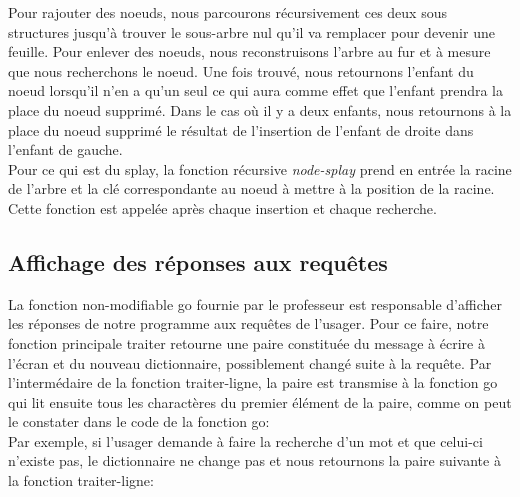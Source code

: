 \documentclass[french]{article}
\begin{document}
		Pour rajouter des noeuds, nous parcourons 
		récursivement ces deux sous structures jusqu'à trouver le sous-arbre 
		nul qu'il va
		remplacer pour devenir une feuille. Pour enlever des noeuds, nous 
		reconstruisons l'arbre au fur et à mesure que nous 
		recherchons le noeud. Une fois trouvé, nous retournons l'enfant du 
		noeud lorsqu'il n'en a qu'un seul ce qui aura comme effet que l'enfant 
		prendra la place du noeud supprimé. Dans le cas où il y a deux 
		enfants, nous retournons à la place du noeud supprimé le résultat de 
		l'insertion de l'enfant de droite dans l'enfant de gauche.\\
			
						Pour ce qui est du splay, la fonction récursive 
						\textit{node-splay} prend en entrée 
						la racine de l'arbre et la clé correspondante au noeud 
						à mettre à 
						la position de la racine. Cette fonction est appelée 
						après chaque 
						insertion et chaque recherche. \\
			
			
			
		\subsection{Affichage des réponses aux requêtes}
			La fonction non-modifiable go fournie par le professeur est responsable d'afficher les réponses de notre programme aux requêtes de l'usager. Pour ce faire, notre fonction principale traiter retourne une paire constituée du message à écrire à l'écran et du nouveau dictionnaire, possiblement changé suite à la requête. Par l'intermédaire de la fonction traiter-ligne, la paire est transmise à la fonction go qui lit ensuite tous les charactères du premier élément de la paire, comme on peut le constater dans le code de la fonction go:
			\\
			
			
			
			
			
			Par exemple, si l'usager demande à faire la recherche d'un mot et que celui-ci n'existe pas, le dictionnaire ne change pas et nous retournons la paire suivante à la fonction traiter-ligne:
			\\
			
			
			
		
\end{document}
